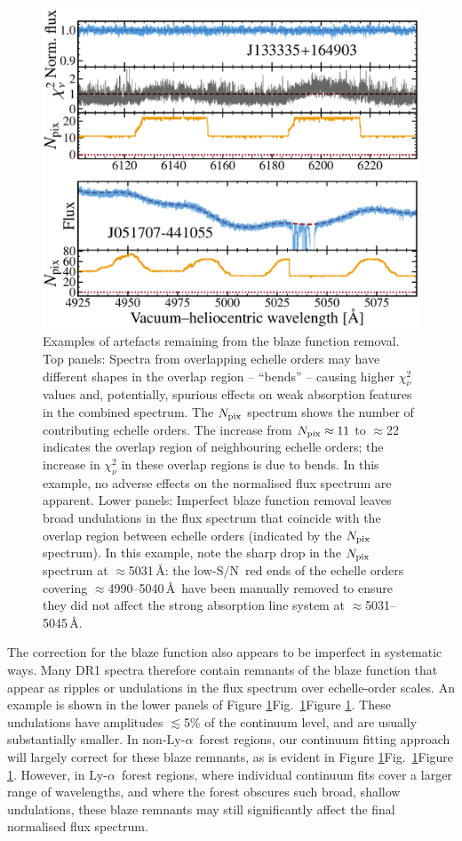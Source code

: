 \documentclass[fleqn,usenatbib,usedcolumn]{mnras}
\renewcommand{\la}{\lesssim} %
\newcommand{\Fref}[1]{\ifhmode \ifnum\spacefactor=1001 Figure \ref{#1}\else Fig.\ \ref{#1}\fi \else Figure \ref{#1}\fi}
\newcommand{\SN}{\ensuremath{\textrm{S/N}}}
\newcommand{\lya}{\ensuremath{\textrm{Ly-}\alpha}}
\begin{document}
\begin{figure}
\begin{center}
\includegraphics[width=0.95\columnwidth]{DR1_bends.pdf}
\vspace{-1em}
\caption{Examples of artefacts remaining from the blaze function removal. Top panels: Spectra from overlapping echelle orders may have different shapes in the overlap region -- ``bends'' -- causing higher $\chi^2_\nu$ values and, potentially, spurious effects on weak absorption features in the combined spectrum. The $N_{\rm pix}$ spectrum shows the number of contributing echelle orders. The increase from $N_{\rm pix}\approx11$ to $\approx$22 indicates the overlap region of neighbouring echelle orders; the increase in $\chi^2_\nu$ in these overlap regions is due to bends. In this example, no adverse effects on the normalised flux spectrum are apparent. Lower panels: Imperfect blaze function removal leaves broad undulations in the flux spectrum that coincide with the overlap region between echelle orders (indicated by the $N_{\rm pix}$ spectrum). In this example, note the sharp drop in the $N_{\rm pix}$ spectrum at $\approx$5031\,\AA: the low-\SN\ red ends of the echelle orders covering $\approx$4990--5040\,\AA\ have been manually removed to ensure they did not affect the strong absorption line system at $\approx$5031--5045\,\AA.}
\label{f:bends}
\end{center}
\end{figure}

The correction for the blaze function also appears to be imperfect in systematic ways. Many DR1 spectra therefore contain remnants of the blaze function that appear as ripples or undulations in the flux spectrum over echelle-order scales. An example is shown in the lower panels of \Fref{f:bends}. These undulations have amplitudes $\la$5\% of the continuum level, and are usually substantially smaller. In non-\lya\ forest regions, our continuum fitting approach will largely correct for these blaze remnants, as is evident in \Fref{f:bends}. However, in \lya\ forest regions, where individual continuum fits cover a larger range of wavelengths, and where the forest obscures such broad, shallow undulations, these blaze remnants may still significantly affect the final normalised flux spectrum.
\end{document}

